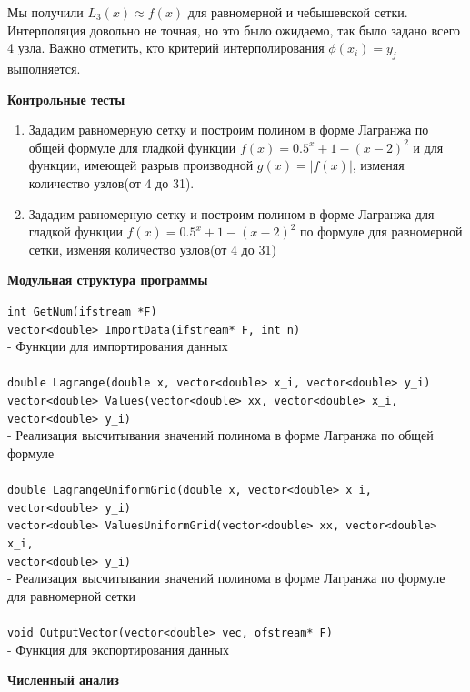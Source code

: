 \documentclass{article}
\begin{document}
	Мы получили $L_3(x) \approx f(x)$ для равномерной и чебышевской сетки. Интерполяция довольно не точная, но это было ожидаемо, так было задано всего 4 узла. Важно отметить, кто критерий интерполирования $\phi(x_i) = y_j$ выполняется.
	\begin{center} \textbf{Контрольные тесты}\end{center}
	\begin{enumerate}
		\item Зададим равномерную сетку и построим полином в форме Лагранжа по общей формуле для гладкой функции $f(x) = 0.5^x + 1 - (x - 2)^2$ и для функции, имеющей разрыв производной $g(x) = |f(x)|$, изменяя количество узлов(от 4 до 31).
		\item Зададим равномерную сетку и построим полином в форме Лагранжа для гладкой функции $f(x) = 0.5^x + 1 - (x - 2)^2$ по формуле для равномерной сетки, изменяя количество узлов(от 4 до 31)
	\end{enumerate}
	\begin{center} \textbf{Модульная структура программы}\end{center}
	\verb|int GetNum(ifstream *F)|\\
	\verb|vector<double> ImportData(ifstream* F, int n)|\\
	- Функции для импортирования данных\\
	\\
	\verb|double Lagrange(double x, vector<double> x_i, vector<double> y_i)|\\
	\verb|vector<double> Values(vector<double> xx, vector<double> x_i, vector<double> y_i)|\\
	- Реализация высчитывания значений полинома в форме Лагранжа по общей формуле\\
	\\
	\verb|double LagrangeUniformGrid(double x, vector<double> x_i, vector<double> y_i)|\\
	\verb|vector<double> ValuesUniformGrid(vector<double> xx, vector<double> x_i, |\\ 
	\verb|vector<double> y_i)|\\
	- Реализация высчитывания значений полинома в форме Лагранжа по формуле для равномерной сетки\\
	\\
	\verb|void OutputVector(vector<double> vec, ofstream* F)|\\
	- Функция для экспортирования данных
	\newpage
	\begin{center} \textbf{Численный анализ}\end{center}
\end{document}
